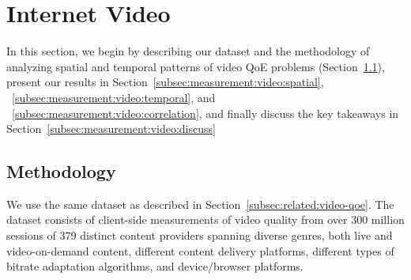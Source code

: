 
\section{Internet Video}
\label{sec:measurement:video} 

\newcommand{\numsessions}{numsessions\xspace}
\newcommand{\problemsession}{problem session\xspace}
\newcommand{\problemsessions}{problem sessions\xspace}
\newcommand{\cluster}{cluster\xspace}
\newcommand{\clusters}{clusters\xspace}
\newcommand{\problemcluster}{problem cluster\xspace}
\newcommand{\problemclusters}{problem clusters\xspace}
\newcommand{\problemratio}{problem ratio\xspace}

\newcommand{\criticalcluster}{critical cluster\xspace}
\newcommand{\criticalclusters}{critical clusters\xspace}

In this section, we begin by describing our dataset and
the methodology of analyzing spatial and temporal patterns
of video QoE problems 
(Section~\ref{subsec:measurement:video:method}),
present our results in 
Section~\ref{subsec:measurement:video:spatial},
~\ref{subsec:measurement:video:temporal}, and
~\ref{subsec:measurement:video:correlation},
and finally discuss the key takeaways in 
Section~\ref{subsec:measurement:video:discuss}

\subsection{Methodology}
\label{subsec:measurement:video:method}

We use the same dataset as described in 
Section~\ref{subsec:related:video-qoe}. 
The dataset consists of client-side measurements of
video  quality from over 300 million sessions of 
379 distinct content providers spanning diverse
genres, both live and video-on-demand content, different
content delivery platforms, different types of  bitrate adaptation
algorithms, and device/browser platforms.

